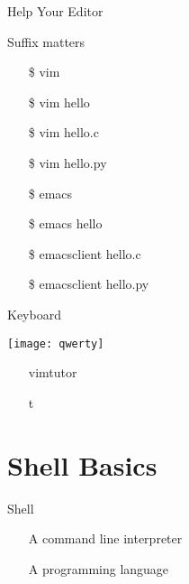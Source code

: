 \begin{frame}{Help Your Editor}
  \begin{block}{Suffix matters}\ttfamily
    \begin{itemize}
    \item[\$] vim \wrong
    \item[\$] vim hello \wrong
    \item[\$] vim hello.c  \correct
    \item[\$] vim hello.py \correct
    \item[\$] emacs \wrong
    \item[\$] emacs hello \wrong
    \item[\$] emacsclient hello.c  \correct
    \item[\$] emacsclient hello.py \correct
    \end{itemize}
  \end{block}
\end{frame}

\begin{frame}{Keyboard}
  \begin{center}
    \texttt{[image: qwerty]}
  \end{center}
  \begin{itemize}
  \item[\vim] vimtutor
  \item[\emacs] \Ch{} {\kbd t}
  \end{itemize}
\end{frame}

\section{Shell Basics}
\label{sec:basic-commands}

\begin{frame}{Shell}
  \begin{itemize}
  \item[\shell] A command line interpreter
  \item[\shell] A programming language
  \end{itemize}
  \begin{center}
  \end{center}
\end{frame}

